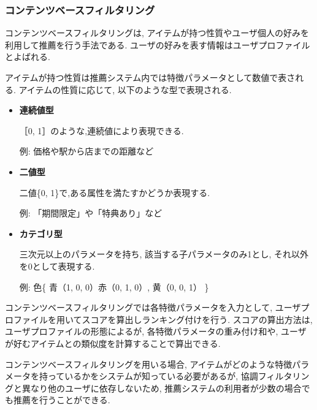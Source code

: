 \subsubsection{コンテンツベースフィルタリング}
コンテンツベースフィルタリングは, アイテムが持つ性質やユーザ個人の好みを利用して推薦を行う手法である.
ユーザの好みを表す情報はユーザプロファイルとよばれる.

アイテムが持つ性質は推薦システム内では特徴パラメータとして数値で表される\cite{recOku}. アイテムの性質に応じて, 以下のような型で表現される.
\begin{itemize}
\item {\bf 連続値型}\par
   ［0, 1］のような,連続値により表現できる.
    \par
    例: 価格や駅から店までの距離など
\item {\bf 二値型}\par
    二値\{0, 1\}で,ある属性を満たすかどうか表現する.
    \par
    例: 「期間限定」や「特典あり」など
\item {\bf カテゴリ型}\par
    三次元以上のパラメータを持ち, 該当する子パラメータのみ1とし, それ以外を0として表現する.
    \par
    例: 色\{ 青（1, 0, 0）赤（0, 1, 0）, 黄（0, 0, 1） \}
\end{itemize}
コンテンツベースフィルタリングでは各特徴パラメータを入力として, ユーザプロファイルを用いてスコアを算出しランキング付けを行う.
スコアの算出方法は, ユーザプロファイルの形態によるが, 各特徴パラメータの重み付け和や, ユーザが好むアイテムとの類似度を計算することで算出できる.

コンテンツベースフィルタリングを用いる場合,
アイテムがどのような特徴パラメータを持っているかをシステムが知っている必要があるが,
協調フィルタリングと異なり他のユーザに依存しないため, 推薦システムの利用者が少数の場合でも推薦を行うことができる.

